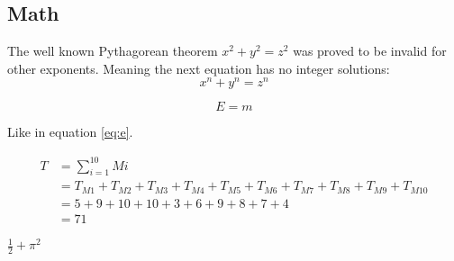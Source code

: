\documentclass[../main.tex]{subfiles}
\begin{document}
\subsection{Math}

The well known Pythagorean theorem \(x^2 + y^2 = z^2\) was 
proved to be invalid for other exponents. 
Meaning the next equation has no integer solutions:
\[ x^n + y^n = z^n \]

\begin{equation}
\label{eq:e}
E=m
\end{equation}

Like in equation \ref{eq:e}.

\begin{equation}\label{eq:tiempo_sec}
    \begin{split}  
    T & =\sum_{i=1}^{10}Mi \\
      & = T_{M1}+T_{M2}+T_{M3}+T_{M4}+T_{M5}+T_{M6}+T_{M7}+T_{M8}+T_{M9}+T_{M10} \\
      & = 5+9+10+10+3+6+9+8+7+4 \\
      & = 71
    \end{split}
\end{equation} 

$\frac{1}{2} + \pi^2$
\end{document}
